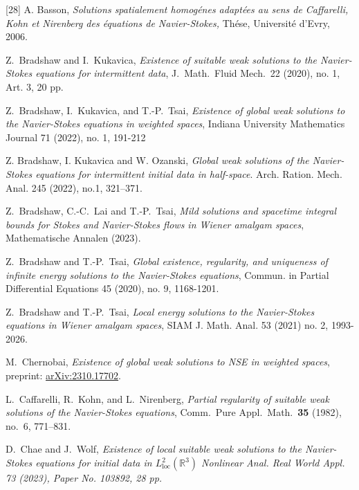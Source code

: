 \documentclass[11pt]{article}
\numberwithin{equation}{section}
\theoremstyle{remark}
\theoremstyle{definition}
\newcommand{\R}{\mathbb{R}}
\newcommand{\loc}{{\mathrm{loc}}}
\begin{document}
\begin{thebibliography}{[28]}
%
%
%
%
 A. Basson, \textit{Solutions spatialement homog\'enes adapt\'ees au sens de Caffarelli, Kohn et Nirenberg des \'equations de Navier-Stokes,} Th\'ese, Universit\'e d’Evry, 2006.

 Z.~Bradshaw and I.~Kukavica,
\emph{Existence of suitable weak solutions to the Navier-Stokes equations for intermittent data},
J.~Math.\ Fluid Mech.~22 (2020), no. 1, Art. 3, 20 pp.

 Z.~Bradshaw, I.~Kukavica, and T.-P.~Tsai,
\emph{Existence of global weak solutions to the Navier-Stokes equations in weighted spaces},
Indiana University Mathematics Journal
%
71 (2022), no. 1, 191-212
%

%
%
%
%
%
%
%
%
%
%
%


 Z. Bradshaw, I. Kukavica and W. Ozanski, \textit{Global weak solutions of the Navier-Stokes equations for intermittent initial data in half-space}. Arch. Ration. Mech. Anal. 245 (2022), no.1, 321–371.

  Z.~Bradshaw, C.-C.~Lai and T.-P.~Tsai,
\emph{Mild solutions and spacetime integral bounds for Stokes and Navier-Stokes flows in Wiener amalgam spaces}, Mathematische Annalen (2023).

 Z.~Bradshaw and T.-P.~Tsai,
   \emph{Global existence, regularity, and uniqueness of infinite energy solutions to the Navier-Stokes equations},
Commun. in Partial Differential Equations 45 (2020), no. 9, 1168-1201.

  Z.~Bradshaw and T.-P.~Tsai,
\emph{Local energy solutions to the Navier-Stokes equations in Wiener amalgam spaces}, SIAM J. Math. Anal.  53 (2021) no. 2, 1993-2026.
%

M.~Chernobai, \textit{Existence of global weak solutions to NSE in weighted spaces}, preprint: 
\href{https://arxiv.org/abs/2310.17702}{arXiv:2310.17702}. 

%
%
%
%

%
 L.~Caffarelli, R.~Kohn, and L.~Nirenberg,
  \emph{Partial regularity of suitable weak solutions of the Navier-Stokes equations},
  Comm.\ Pure Appl.\ Math.~\textbf{35} (1982), no.~6, 771--831.
%

 D.~Chae and J.~Wolf,
\textit{Existence of local suitable weak solutions to the Navier-Stokes equations for initial data in  $L^2_{\loc}(\R^3)$ 
Nonlinear Anal. Real World Appl. 73 (2023), Paper No. 103892, 28 pp.}
%
%
%
%
%
%
%
%
%
%


\end{thebibliography}
\end{document}

